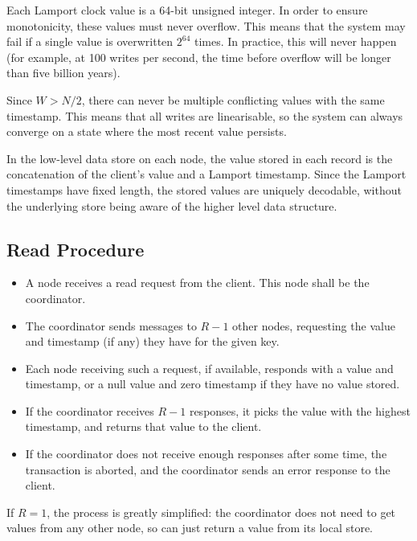\documentclass[12pt,a4paper,twoside,openany]{report}
\begin{document}
Each Lamport clock value is a 64-bit unsigned integer. In order to ensure monotonicity, these values must never overflow. This means that the system may fail if a single value is overwritten $2^64$ times. In practice, this will never happen (for example, at 100 writes per second, the time before overflow will be longer than five billion years).

Since $W > N / 2$, there can never be multiple conflicting values with the same timestamp. This means that all writes are linearisable, so the system can always converge on a state where the most recent value persists.

In the low-level data store on each node, the value stored in each record is the concatenation of the client's value and a Lamport timestamp. Since the Lamport timestamps have fixed length, the stored values are uniquely decodable, without the underlying store being aware of the higher level data structure.

\subsection{Read Procedure}

\begin{itemize}
\item
A node receives a read request from the client. This node shall be the coordinator.

\item
The coordinator sends messages to $R - 1$ other nodes, requesting the value and timestamp (if any) they have for the given key.

\item
Each node receiving such a request, if available, responds with a value and timestamp, or a null value and zero timestamp if they have no value stored.

\item
If the coordinator receives $R - 1$ responses, it picks the value with the highest timestamp, and returns that value to the client.

\item
If the coordinator does not receive enough responses after some time, the transaction is aborted, and the coordinator sends an error response to the client.

\end{itemize}

If $R = 1$, the process is greatly simplified: the coordinator does not need to get values from any other node, so can just return a value from its local store.
\end{document}
